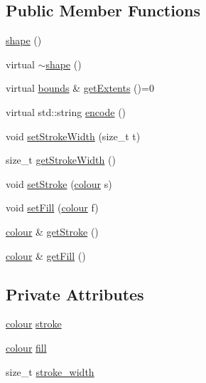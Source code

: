 \subsection*{Public Member Functions}
\begin{DoxyCompactItemize}
\item 
\hyperlink{classgraphics_1_1shape_a4bb20a9261038c87fe3a30e2bad5bd49}{shape} ()
\item 
virtual \hyperlink{classgraphics_1_1shape_a1ce13e65926bca4f7690859647f6e3ef}{$\sim$shape} ()
\item 
virtual \hyperlink{classgraphics_1_1bounds}{bounds} \& \hyperlink{classgraphics_1_1shape_a948bd22d258ce2122b81c7385a315596}{get\+Extents} ()=0
\item 
virtual std\+::string \hyperlink{classgraphics_1_1shape_a171a3bc288e0633c109571d908033b56}{encode} ()
\item 
void \hyperlink{classgraphics_1_1shape_a61805bb768ea7f4e817317c9bfee519d}{set\+Stroke\+Width} (size\+\_\+t t)
\item 
size\+\_\+t \hyperlink{classgraphics_1_1shape_a66fed3c60869f6d37d5bb2bfd9f0e1dc}{get\+Stroke\+Width} ()
\item 
void \hyperlink{classgraphics_1_1shape_abe791443e0323b0719c16c42d9ee0e2e}{set\+Stroke} (\hyperlink{structgraphics_1_1colour}{colour} s)
\item 
void \hyperlink{classgraphics_1_1shape_a4faba733e9a95685f22e283143488104}{set\+Fill} (\hyperlink{structgraphics_1_1colour}{colour} f)
\item 
\hyperlink{structgraphics_1_1colour}{colour} \& \hyperlink{classgraphics_1_1shape_afa69ccf80e9ea6b2effef9e2f2360c19}{get\+Stroke} ()
\item 
\hyperlink{structgraphics_1_1colour}{colour} \& \hyperlink{classgraphics_1_1shape_a31e32379425b32042d6aa49716c1db30}{get\+Fill} ()
\end{DoxyCompactItemize}
\subsection*{Private Attributes}
\begin{DoxyCompactItemize}
\item 
\hyperlink{structgraphics_1_1colour}{colour} \hyperlink{classgraphics_1_1shape_a3469d2d41634a0b8910375b00c3b66a2}{stroke}
\item 
\hyperlink{structgraphics_1_1colour}{colour} \hyperlink{classgraphics_1_1shape_a05833e89a21bbf3a65ee8d4e0a65e3b6}{fill}
\item 
size\+\_\+t \hyperlink{classgraphics_1_1shape_ae17f4db0be20c3b4eaf98544dc3856b4}{stroke\+\_\+width}
\end{DoxyCompactItemize}


